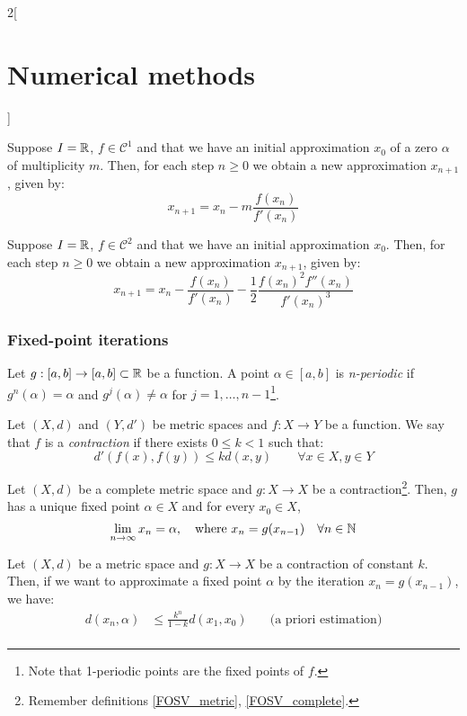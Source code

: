 \documentclass[../../../main.tex]{subfiles}
\begin{document}
\begin{multicols}{2}[\section{Numerical methods}]
\begin{method}
  \end{method}
  \begin{method}
    Suppose $I=\mathbb{R}$, $f\in\mathcal{C}^1$ and that we have an initial approximation $x_0$ of a zero $\alpha$ of multiplicity $m$. Then, for each step $n\geq 0$ we obtain a new approximation $x_{n+1}$, given by: $$x_{n+1}=x_n-m\frac{f(x_n)}{f'(x_n)}$$
  \end{method}
  \begin{method}
    Suppose $I=\mathbb{R}$, $f\in\mathcal{C}^2$ and that we have an initial approximation $x_0$. Then, for each step $n\geq 0$ we obtain a new approximation $x_{n+1}$, given by: $$x_{n+1}=x_n-\frac{f(x_n)}{f'(x_n)}-\frac{1}{2}\frac{{f(x_n)}^2f''(x_n)}{{f'(x_n)}^3}$$
  \end{method}
  \subsubsection{Fixed-point iterations}
  \begin{definition}
    Let $g:[a,b]\rightarrow[a,b]\subset\mathbb{R}$ be a function. A point $\alpha\in[a,b]$ is \textit{n-periodic} if $g^n(\alpha)=\alpha$ and $g^j(\alpha)\ne\alpha$ for $j=1,\ldots,n-1$\footnote{Note that 1-periodic points are the fixed points of $f$.}.
  \end{definition}
  \begin{definition}
    Let $(X,d)$ and $(Y,d')$  be metric spaces and $f:X\rightarrow Y$ be a function. We say that $f$ is a \textit{contraction} if there exists $0\leq k<1$ such that: $$d'(f(x),f(y))\leq kd(x,y)\qquad\forall x\in X,y\in Y$$
  \end{definition}
  \begin{theorem}
    Let $(X,d)$ be a complete metric space and $g:X\rightarrow X$ be a contraction\footnote{Remember definitions \ref{FOSV_metric}, \ref{FOSV_complete}.}. Then, $g$ has a unique fixed point $\alpha\in X$ and for every $x_0\in X$, $$\lim_{n\to\infty}x_n=\alpha,\quad\text{where }x_n=g(x_{n-1})\quad\forall n\in\mathbb{N}$$
  \end{theorem}
  \begin{prop}
    Let $(X,d)$ be a metric space and $g:X\rightarrow X$ be a contraction of constant $k$. Then, if we want to approximate a fixed point $\alpha$ by the iteration $x_n=g(x_{n-1})$, we have:
    \begin{align*}
      d(x_n,\alpha) & \leq\frac{k^n}{1-k}d(x_1,x_0)\quad   & \text{(a priori estimation)}     \\

\end{align*}
\end{prop}
\end{multicols}
\end{document}
